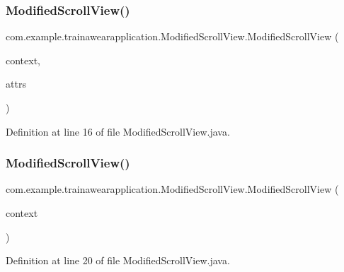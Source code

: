 \subsubsection{\texorpdfstring{ModifiedScrollView()}{ModifiedScrollView()}\hspace{0.1cm}{\footnotesize\ttfamily [1/2]}}
{\footnotesize\ttfamily com.\+example.\+trainawearapplication.\+Modified\+Scroll\+View.\+Modified\+Scroll\+View (\begin{DoxyParamCaption}\item[{Context}]{context,  }\item[{Attribute\+Set}]{attrs }\end{DoxyParamCaption})}



Definition at line 16 of file Modified\+Scroll\+View.\+java.


\begin{DoxyCode}{0}

\end{DoxyCode}
\mbox{\label{classcom_1_1example_1_1trainawearapplication_1_1_modified_scroll_view_a60a3e71da3963714f6ec401034a80c6f}} 
\subsubsection{\texorpdfstring{ModifiedScrollView()}{ModifiedScrollView()}\hspace{0.1cm}{\footnotesize\ttfamily [2/2]}}
{\footnotesize\ttfamily com.\+example.\+trainawearapplication.\+Modified\+Scroll\+View.\+Modified\+Scroll\+View (\begin{DoxyParamCaption}\item[{Context}]{context }\end{DoxyParamCaption})}



Definition at line 20 of file Modified\+Scroll\+View.\+java.


\begin{DoxyCode}{0}

\end{DoxyCode}


